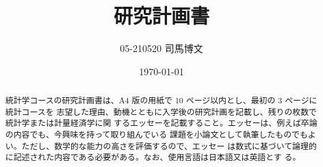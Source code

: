 \documentclass[uplatex, dvipdfmx]{jsarticle}
\title{研究計画書}
\author{05-210520 司馬博文}
\date{\today}
\begin{document}
\begin{abstract}
    統計学コースの研究計画書は、A4 版の用紙で 10 ページ以内とし、最初の 3 ページに統計コースを
    志望した理由、動機とともに入学後の研究計画を記載し、残りの枚数で統計学または計量経済学に関
    するエッセーを記載すること。エッセーは、例えば卒論の内容でも、今興味を持って取り組んでいる
    課題を小論文として執筆したものでもよい。ただし、数学的な能力の高さを評価するので、エッセー
    は数式に基づいて論理的に記述された内容である必要がある。なお、使用言語は日本語又は英語とす
    る。
\end{abstract}
\end{document}
